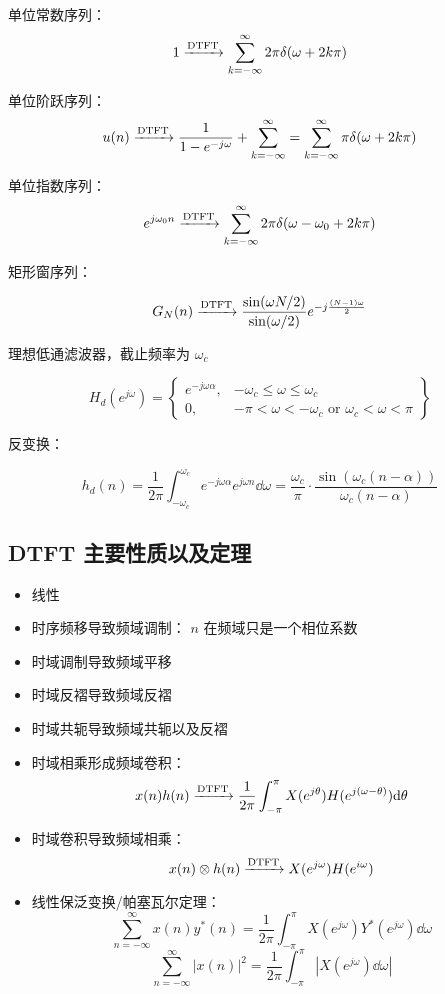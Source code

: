 \documentclass[cn,11pt,chinese,black,simple]{../elegantbook}
\begin{document}
单位常数序列：
\[1 \xrightarrow{\text{DTFT}} \sum_{k=-\infty}^\infty 2 \pi \delta(\omega + 2 k \pi)\]

单位阶跃序列：
\[u(n) \xrightarrow{\text{DTFT}} \frac{1}{1 - e^{-j \omega}} + \sum_{k = -\infty}^\infty = \sum_{k=-\infty}^\infty \pi \delta(\omega + 2 k \pi)\]

单位指数序列：
\[e^{j \omega_0 n} \xrightarrow{\text{DTFT}} \sum_{k=-\infty}^\infty 2 \pi \delta(\omega - \omega_0 + 2 k \pi)\]

矩形窗序列：

\[G_N(n) \xrightarrow{\text{DTFT}} \frac{\sin(\omega N / 2)}{\sin(\omega / 2)}e^{-j \frac{(N-1)\omega}{2}}\]

理想低通滤波器，截止频率为 \(\omega_c\)

\[H_d(e^{j\omega}) = \left\{
\begin{aligned}
    e^{-j\omega \alpha}, & -\omega_c \leq \omega \leq \omega_c \\
    0, &-\pi < \omega < -\omega_c \text{ or } \omega_c < \omega < \pi 
\end{aligned}    
\right\}\]

反变换：

\[
h_d(n) = \frac{1}{2 \pi} \int_{-\omega_c}^{\omega_c}e^{-j\omega \alpha} e^{j\omega n} \dd{\omega} = \frac{\omega_c}{\pi} \cdot \frac{\sin (\omega_c(n-\alpha))}{\omega_c (n-\alpha)}
\]

\subsection{DTFT 主要性质以及定理}

\begin{itemize}
    \item 线性
    \item 时序频移导致频域调制： \(n\) 在频域只是一个相位系数
    \item 时域调制导致频域平移
    \item 时域反褶导致频域反褶
    \item 时域共轭导致频域共轭以及反褶
    \item 时域相乘形成频域卷积：\[x(n)h(n) \xrightarrow{\text{DTFT}} \frac{1}{2 \pi} \int_{-\pi}^\pi X(e^{j\theta})H(e^{j(\omega-\theta)}) \mathrm{d}\theta\]
    \item 时域卷积导致频域相乘：\[x(n) \otimes h(n) \xrightarrow{\text{DTFT}} X(e^{j\omega}) H(e^{i \omega})\]
    \item 线性保泛变换/帕塞瓦尔定理：\[\sum_{n = -\infty}^\infty x(n) y^*(n) = \frac{1}{2\pi} \int_{-\pi}^{\pi} X(e^{j \omega}) Y^*(e^{j\omega}) \dd{\omega}\]
    \[\sum_{n=-\infty}^{\infty} |x(n)|^2 = \frac{1}{2\pi} \int_{-\pi}^{\pi}  |X(e^{j\omega}) \dd{\omega}|\]
\end{itemize}
\end{document}
